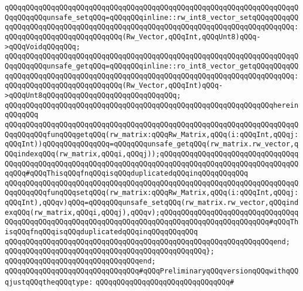 \newline
\verb|qQQqqQQqqQQqqQQqqQQqqQQqqQQqqQQqqQQqqQQqqQQqqQQqqQQqqQQqqQQqqQQqqQQqqQQqqQQqqQQqunsafe_setqQQq=qQQqqQQqinline::rw_int8_vector_setqQQqqQQqqQQqqQQqqQQqqQQqqQQqqQQqqQQqqQQqqQQqqQQqqQQqqQQqqQQqqQQqqQQqqQQqqQQqqQQq:qQQqqQQqqQQqqQQqqQQqqQQqqQQq(Rw_Vector,qQQqInt,qQQqUnt8)qQQq->qQQqVoidqQQqqQQq;|\newline
\verb|qQQqqQQqqQQqqQQqqQQqqQQqqQQqqQQqqQQqqQQqqQQqqQQqqQQqqQQqqQQqqQQqqQQqqQQqqQQqqQQqunsafe_getqQQq=qQQqqQQqinline::ro_int8_vector_getqQQqqQQqqQQqqQQqqQQqqQQqqQQqqQQqqQQqqQQqqQQqqQQqqQQqqQQqqQQqqQQqqQQqqQQqqQQqqQQq:qQQqqQQqqQQqqQQqqQQqqQQqqQQq(Rw_Vector,qQQqInt)qQQq->qQQqUnt8qQQqqQQqqQQqqQQqqQQqqQQqqQQqqQQq;|\newline
\verb|qQQqqQQqqQQqqQQqqQQqqQQqqQQqqQQqqQQqqQQqqQQqqQQqqQQqqQQqqQQqqQQqhereinqQQqqQQq|\newline
\verb|qQQqqQQqqQQqqQQqqQQqqQQqqQQqqQQqqQQqqQQqqQQqqQQqqQQqqQQqqQQqqQQqqQQqqQQqqQQqqQQqfunqQQqgetqQQq(rw_matrix:qQQqRw_Matrix,qQQq(i:qQQqInt,qQQqj:qQQqInt))qQQqqQQqqQQqqQQq=qQQqqQQqunsafe_getqQQq(rw_matrix.rw_vector,qQQqindexqQQq(rw_matrix,qQQqi,qQQqj));qQQqqQQqqQQqqQQqqQQqqQQqqQQqqQQqqQQqqQQqqQQqqQQqqQQqqQQqqQQqqQQqqQQqqQQqqQQqqQQqqQQqqQQqqQQqqQQqqQQqqQQqqQQq#qQQqThisqQQqfnqQQqisqQQqduplicatedqQQqinqQQqqQQqqQQq|\newline
\verb|qQQqqQQqqQQqqQQqqQQqqQQqqQQqqQQqqQQqqQQqqQQqqQQqqQQqqQQqqQQqqQQqqQQqqQQqqQQqqQQqfunqQQqsetqQQq(rw_matrix:qQQqRw_Matrix,qQQq(i:qQQqInt,qQQqj:qQQqInt),qQQqv)qQQq=qQQqqQQqunsafe_setqQQq(rw_matrix.rw_vector,qQQqindexqQQq(rw_matrix,qQQqi,qQQqj),qQQqv);qQQqqQQqqQQqqQQqqQQqqQQqqQQqqQQqqQQqqQQqqQQqqQQqqQQqqQQqqQQqqQQqqQQqqQQqqQQqqQQqqQQqqQQqqQQqqQQq#qQQqThisqQQqfnqQQqisqQQqduplicatedqQQqinqQQqqQQqqQQq|\newline
\verb|qQQqqQQqqQQqqQQqqQQqqQQqqQQqqQQqqQQqqQQqqQQqqQQqqQQqqQQqqQQqqQQqend;|\newline
\verb|qQQqqQQqqQQqqQQqqQQqqQQqqQQqqQQqqQQqqQQqqQQqqQQq};|\newline
\verb|qQQqqQQqqQQqqQQqqQQqqQQqqQQqqQQqend;|\newline
\newline
\newline
\verb|qQQqqQQqqQQqqQQqqQQqqQQqqQQqqQQq#qQQqPreliminaryqQQqversionqQQqwithqQQqjustqQQqtheqQQqtype:|\newline
\verb|qQQqqQQqqQQqqQQqqQQqqQQqqQQqqQQq#|\newline
